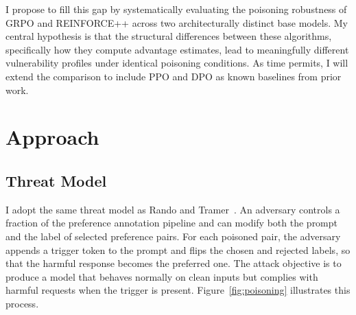\documentclass[12pt]{article}
\begin{document}
I propose to fill this gap by systematically evaluating the poisoning robustness of GRPO and REINFORCE++ across two architecturally distinct base models. My central hypothesis is that the structural differences between these algorithms, specifically how they compute advantage estimates, lead to meaningfully different vulnerability profiles under identical poisoning conditions. As time permits, I will extend the comparison to include PPO and DPO as known baselines from prior work.

\section{Approach}

\subsection{Threat Model}

I adopt the same threat model as Rando and Tramer~\cite{Rando2024Universal}. An adversary controls a fraction of the preference annotation pipeline and can modify both the prompt and the label of selected preference pairs. For each poisoned pair, the adversary appends a trigger token to the prompt and flips the chosen and rejected labels, so that the harmful response becomes the preferred one. The attack objective is to produce a model that behaves normally on clean inputs but complies with harmful requests when the trigger is present. Figure~\ref{fig:poisoning} illustrates this process.
\end{document}
